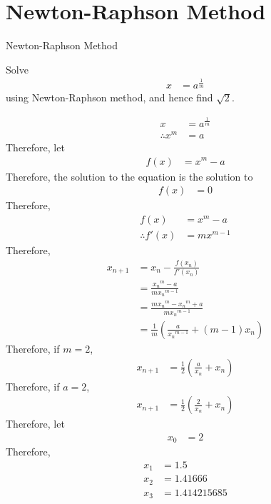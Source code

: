 \documentclass[fleqn, a4paper, 12pt, twoside, titlepage]{article}
\theoremstyle{definition}
\theoremstyle{theorem}
\begin{document}
\section{Newton-Raphson Method}

\begin{algorithm}[H]
	\begin{algorithmic}[1]
	\end{algorithmic}
	\caption{Newton-Raphson Method}
\end{algorithm}

\begin{question}
	Solve
	\begin{align*}
		x &= a^{\frac{1}{m}}
	\end{align*}
	using Newton-Raphson method, and hence find $\sqrt{2}$.
\end{question}

\begin{solution}
	\begin{align*}
		x &= a^{\frac{1}{m}}\\
		\therefore x^m &= a
	\end{align*}
	Therefore, let
	\begin{align*}
		f(x) &= x^m - a
	\end{align*}
	Therefore, the solution to the equation is the solution to
	\begin{align*}
		f(x) &= 0
	\end{align*}
	Therefore,
	\begin{align*}
		f(x) &= x^m - a\\
		\therefore f'(x) &= m x^{m - 1}
	\end{align*}
	Therefore,
	\begin{align*}
		x_{n + 1} &= x_n - \frac{f(x_n)}{f'(x_n)}\\
		&= \frac{{x_n}^m - a}{m {x_n}^{m - 1}}\\
		&= \frac{m {x_n}^m - {x_n}^m + a}{m {x_n}^{m - 1}}\\
		&= \frac{1}{m} \left( \frac{a}{{x_n}^{m - 1}} + (m - 1) x_n \right)
	\end{align*}
	Therefore, if $m = 2$,
	\begin{align*}
		x_{n + 1} &= \frac{1}{2} \left( \frac{a}{x_n} + x_n \right)
	\end{align*}
	Therefore, if $a = 2$,
	\begin{align*}
		x_{n + 1} &= \frac{1}{2} \left( \frac{2}{x_n} + x_n \right)
	\end{align*}
	Therefore, let
	\begin{align*}
		x_0 &= 2
	\end{align*}
	Therefore,
	\begin{align*}
		x_1 &= 1.5\\
		x_2 &= 1.41666\\
		x_3 &= 1.414215685
	\end{align*}
\end{solution}
\end{document}
